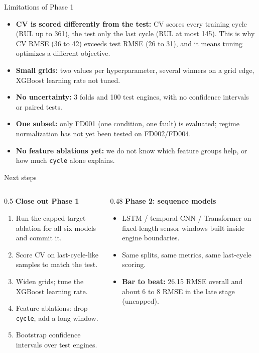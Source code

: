 \documentclass[aspectratio=169,11pt]{beamer}
\begin{document}
\begin{frame}{Limitations of Phase 1}
  \small
  \begin{itemize}
    \item \textbf{CV is scored differently from the test:} CV scores every
      training cycle (RUL up to 361), the test only the last cycle (RUL at
      most 145). This is why CV RMSE (36 to 42) exceeds test RMSE (26 to 31),
      and it means tuning optimizes a different objective.
    \item \textbf{Small grids:} two values per hyperparameter, several winners
      on a grid edge, XGBoost learning rate not tuned.
    \item \textbf{No uncertainty:} 3 folds and 100 test engines, with no
      confidence intervals or paired tests.
    \item \textbf{One subset:} only FD001 (one condition, one fault) is
      evaluated; regime normalization has not yet been tested on FD002/FD004.
    \item \textbf{No feature ablations yet:} we do not know which feature
      groups help, or how much \texttt{cycle} alone explains.
  \end{itemize}
\end{frame}

\begin{frame}{Next steps}
  \small
  \begin{columns}[T]
    \begin{column}{0.5\textwidth}
      \textbf{Close out Phase 1}
      \begin{enumerate}
        \item Run the capped-target ablation for all six models and commit it.
        \item Score CV on last-cycle-like samples to match the test.
        \item Widen grids; tune the XGBoost learning rate.
        \item Feature ablations: drop \texttt{cycle}, add a long window.
        \item Bootstrap confidence intervals over test engines.
      \end{enumerate}
    \end{column}
    \begin{column}{0.48\textwidth}
      \textbf{Phase 2: sequence models}
      \begin{itemize}
        \item LSTM / temporal CNN / Transformer on fixed-length sensor
          windows built inside engine boundaries.
        \item Same splits, same metrics, same last-cycle scoring.
        \item \textbf{Bar to beat:} 26.15 RMSE overall and about 6 to 8 RMSE
          in the late stage (uncapped).
      \end{itemize}
    \end{column}
  \end{columns}
\end{frame}
\end{document}

